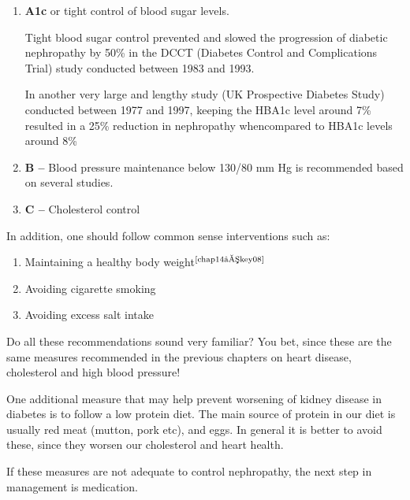 
\vspace{-\topsep}
\begin{enumerate}[\ding{118}]
\itemsep=0pt
\item \textbf{A1c} or tight control of blood sugar levels.

Tight blood sugar control prevented and slowed the progression of diabetic nephropathy by 50\% in the DCCT (Diabetes Control and Complications Trial) study conducted between 1983 and 1993.

In another very large and lengthy study (UK Prospective Diabetes Study) conducted between 1977 and 1997, keeping the HBA1c level around 7\% resulted in a 25\% reduction in nephropathy when\break compared to HBA1c levels around 8\%
\item \textbf{B –} Blood pressure maintenance below 130/80 mm Hg is recomme\-nded based on several studies.
\item \textbf{C –} Cholesterol control
\end{enumerate}
\vspace{-\topsep}

In addition, one should follow common sense interventions such as:

\vspace{-\topsep}
\begin{enumerate}[•]
\itemsep=0pt
\item Maintaining a healthy body weight$^{\text{\cite{chap14–key08}}}$
\item Avoiding cigarette smoking
\item Avoiding excess salt intake
\end{enumerate}

Do all these recommendations sound very familiar? You bet, since these are the same measures recommended in the previous chapters on heart disease, cholesterol and high blood pressure!

One additional measure that may help prevent worsening of kidney disease in diabetes is to follow a low protein diet. The main source of protein in our diet is usually red meat (mutton, pork etc), and eggs. In general it is better to avoid these, since they worsen our cholesterol and heart health.

If these measures are not adequate to control nephropathy, the next step in management is medication.


